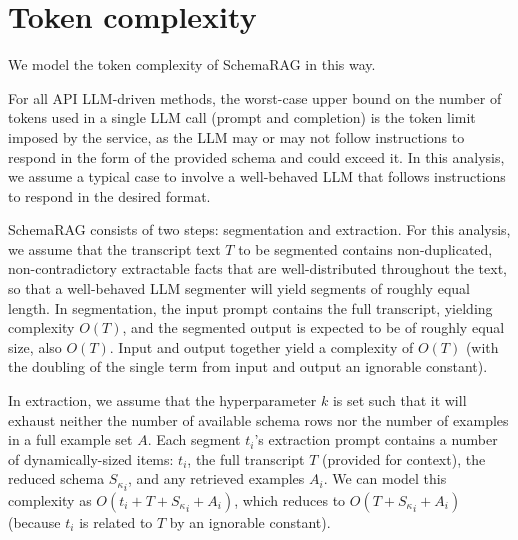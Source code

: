 \section{Token complexity}
\label{sec:token_complexity}


We model the token complexity of SchemaRAG in this way.

For all API LLM-driven methods, the worst-case upper bound on the number of tokens used in a single LLM call (prompt and completion) is the token limit imposed by the service, as the LLM may or may not follow instructions to respond in the form of the provided schema and could exceed it. In this analysis, we assume a typical case to involve a well-behaved LLM that follows instructions to respond in the desired format. 

SchemaRAG consists of two steps: segmentation and extraction. 
For this analysis, we assume that the transcript text $T$ to be segmented contains non-duplicated, non-contradictory extractable facts that are well-distributed throughout the text, so that a well-behaved LLM segmenter will yield segments of roughly equal length.
In segmentation, the input prompt contains the full transcript, yielding complexity $O(T)$, and the segmented output is expected to be of roughly equal size, also $O(T)$. Input and output together yield a complexity of $O(T)$ (with the doubling of the single term from input and output an ignorable constant).

In extraction, we assume that the hyperparameter $k$ is set such that it will exhaust neither the number of available schema rows nor the number of examples in a full example set $A$. Each segment $t_i$'s extraction prompt contains a number of dynamically-sized items: $t_i$, the full transcript $T$ (provided for context),
the reduced schema ${S_\kappa}_i$, and any retrieved examples $A_i$. We can model this complexity as $O(t_i + T + {S_\kappa}_i + A_i)$, which reduces to $O(T + {S_\kappa}_i + A_i)$ (because $t_i$ is related to $T$ by an ignorable constant).

